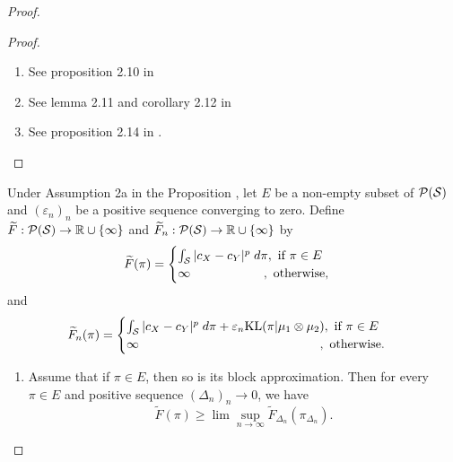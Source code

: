 \begin{proof}
\begin{proof}
\begin{enumerate}
        \item See proposition 2.10 in \citep{Carlier17}
        \item See lemma 2.11 and corollary 2.12 in \citep{Carlier17}
        \item See proposition 2.14 in \citep{Carlier17}.
      \end{enumerate}
    \end{proof}
    \begin{lemma} \label{lemma:limsupinf}
      Under Assumption 2a in the Proposition ,
      let $E$ be a non-empty subset of $\mathcal P(\mathcal S)$ and $(\varepsilon_n)_n$ be a positive sequence converging to zero.
      Define $\widetilde{F}: \mathcal P(\mathcal S) \to \mathbb R \cup \{ \infty \}$ and
      $\widetilde{F}_n: \mathcal P(\mathcal S) \to \mathbb R \cup \{ \infty \}$ by
      \begin{equation}
        \widetilde{F}(\pi) =
        \begin{cases}
          \int_{\mathcal S} \vert c_X - c_Y \vert^p \; d\pi, \text{ if } \pi \in E \\
          \infty \;\;\;\;\;\;\;\;\;\;\;\;\;\;\;\;\;\;\;\;\; ,\text{ otherwise},
        \end{cases}
      \end{equation}
      and
      \begin{equation}
        \widetilde{F}_n(\pi) =
        \begin{cases}
          \int_{\mathcal S} \vert c_X - c_Y \vert^p \; d\pi + \varepsilon_n \text{KL}(\pi \vert \mu_1 \otimes \mu_2), \text{ if } \pi \in E \\
          \infty \;\;\;\;\;\;\;\;\;\;\;\;\;\;\;\;\;\;\;\;\;\;\;\;\;\;\;\;\;\;\;\;\;\;\;\;\;\;\;\;\;\;\;\;\;\;\;\;\;\;\;\; ,\text{ otherwise}.
        \end{cases}
      \end{equation}
      \begin{enumerate}
        \item Assume that if $\pi \in E$, then so is its block approximation. Then for every $\pi \in E$ and positive sequence $(\Delta_n)_n \to 0$, we have
        \begin{equation}
          \widetilde{F}(\pi) \geq \lim\sup_{n \to \infty} \widetilde{F}_{\Delta_n}(\pi_{\Delta_n}).
        \end{equation}


\end{enumerate}
\end{lemma}
\end{proof}
